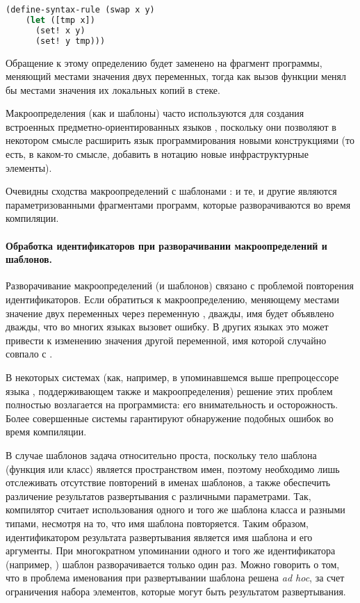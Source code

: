 {\begin{lstlisting}[language=Lisp,label=scheme_swap]
 (define-syntax-rule (swap x y)
    (let ([tmp x])
      (set! x y)
      (set! y tmp)))
\end{lstlisting}

Обращение к этому определению будет заменено на фрагмент программы, меняющий местами значения двух переменных, тогда как вызов функции менял бы местами значения их локальных копий в стеке.

Макроопределения (как и шаблоны) часто используются для создания встроенных предметно-ориентированных языков \cite{???}, поскольку они позволяют в некотором смысле расширить язык программирования новыми конструкциями (то есть, в каком-то смысле, добавить в нотацию новые инфраструктурные элементы).

Очевидны сходства макроопределений  с шаблонами : и те, и другие являются параметризованными фрагментами программ, которые разворачиваются во время компиляции. 

\paragraph*{Обработка идентификаторов при разворачивании макроопределений и шаблонов.}
Разворачивание макроопределений (и шаблонов) связано с проблемой повторения идентификаторов. Если обратиться к макроопределению, меняющему местами значение двух переменных через переменную , дважды, имя  будет объявлено дважды, что во многих языках вызовет ошибку. В других языках это может привести к изменению значения другой переменной, имя которой случайно совпало с .

В некоторых системах (как, например, в упоминавшемся выше препроцессоре языка , поддерживающем также и макроопределения) решение этих проблем полностью возлагается на программиста: его внимательность и осторожность. Более совершенные системы гарантируют обнаружение подобных ошибок во время компиляции.

В случае шаблонов  задача относительно проста, поскольку тело шаблона (функция или класс) является пространством имен, поэтому необходимо лишь отслеживать отсутствие повторений в именах шаблонов, а также обеспечить различение результатов развертывания с различными параметрами. Так, компилятор считает использования одного и того же шаблона класса  и  разными типами, несмотря на то, что имя шаблона повторяется. Таким образом, идентификатором результата развертывания является имя шаблона и его аргументы. При многократном упоминании одного и того же идентификатора (например, ) шаблон разворачивается только один раз. Можно говорить о том, что в  проблема именования при развертывании шаблона решена \emph{ad hoc}, за счет ограничения набора элементов, которые могут быть результатом развертывания.

}
